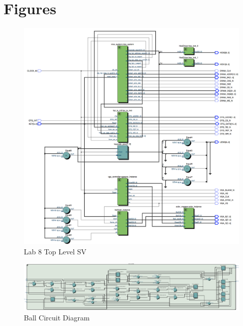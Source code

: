 \documentclass[journal, twocolumn, final,11pt,letterpaper]{IEEEtran}
\begin{document}
\clearpage
\onecolumn
\section{Figures}

\begin{figure} [H]
	\centering
	\includegraphics[scale=.5]{top_level_diagram.png}
	\caption{Lab 8 Top Level SV\label{fig:top-level}}
\end{figure}

\begin{figure} [H]
	\centering
	\includegraphics[scale=1]{ball_diagram.pdf}
	\caption{Ball Circuit Diagram\label{fig:ball}}
\end{figure}
\end{document}
